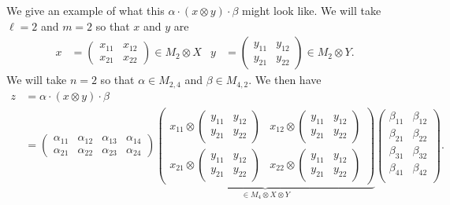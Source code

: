 \documentclass[12pt]{article}
\theoremstyle{definition}
\newenvironment{example}
  {\pushQED{\qed}\renewcommand{\qedsymbol}{\textcircled{\tiny E}}\examplex}
  {\popQED\endexamplex}
\newcommand{\<}{\langle}
\renewcommand{\>}{\rangle}
\begin{document}
\begin{example}
    We give an example of what this $\alpha \cdot (x \otimes y) \cdot \beta$ might look like. We will take $\ell = 2$ and $m = 2$ so that $x$ and $y$ are
    \begin{align*}
        x &= \begin{pmatrix}
            x_{11} & x_{12} \\ x_{21} & x_{22}
        \end{pmatrix} \in M_2 \otimes X
        & y &= \begin{pmatrix}
            y_{11} & y_{12}  \\ y_{21} & y_{22} 
        \end{pmatrix} \in M_2 \otimes Y.
    \end{align*}
    We will take $n =2$ so that $\alpha \in M_{2, 4}$ and $\beta \in M_{4,2}$. We then have 
    \begin{align*}
        z &= \alpha \cdot (x \otimes y) \cdot \beta \\
        &= \begin{pmatrix}
            \alpha_{11} & \alpha_{12} &\alpha_{13} &\alpha_{14}  \\
            \alpha_{21} & \alpha_{22} &\alpha_{23} &\alpha_{24} 
        \end{pmatrix}
        \underbrace{\begin{pmatrix}
            x_{11} \otimes \begin{pmatrix}
            y_{11} & y_{12}  \\ y_{21} & y_{22} 
        \end{pmatrix} & x_{12} \otimes \begin{pmatrix}
            y_{11} & y_{12}  \\ y_{21} & y_{22} 
        \end{pmatrix} \\
        x_{21} \otimes \begin{pmatrix}
            y_{11} & y_{12}  \\ y_{21} & y_{22} 
        \end{pmatrix} & x_{22} \otimes \begin{pmatrix}
            y_{11} & y_{12}  \\ y_{21} & y_{22} 
        \end{pmatrix}
        \end{pmatrix}}_{\in M_{4} \otimes X \otimes Y}
        \begin{pmatrix}
            \beta_{11} & \beta_{12} \\
            \beta_{21} & \beta_{22} \\
            \beta_{31} & \beta_{32} \\
            \beta_{41} & \beta_{42} \\
        \end{pmatrix}.
    \end{align*}
\end{example}
\end{document}
